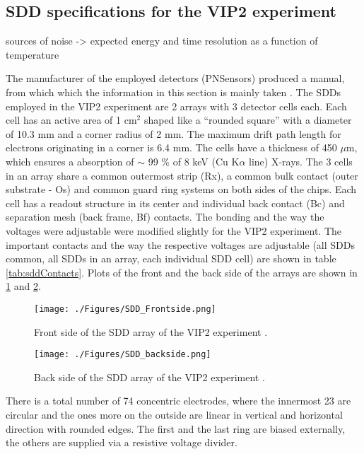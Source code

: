 \subsection{SDD specifications for the VIP2 experiment}

sources of noise -> expected energy and time resolution as a function of temperature 


The manufacturer of the employed detectors (PNSensors) produced a manual, from which which the information in this section is mainly taken \cite{Lechner}. The SDDs employed in the VIP2 experiment are 2 arrays with 3 detector cells each. Each cell has an active area of 1 cm$^{2}$ shaped like a ``rounded square'' with a diameter of 10.3 mm and a corner radius of 2 mm. The maximum drift path length for electrons originating in a corner is 6.4 mm. The cells have a thickness of 450 $\mu$m, which ensures a absorption of $\sim$ 99 \% of 8 keV (Cu K$\alpha$ line) X-rays. The 3 cells in an array share a common outermost strip (Rx), a common bulk contact (outer substrate - Os) and common guard ring systems on both sides of the chips. Each cell has a readout structure in its center and individual back contact (Bc) and separation mesh (back frame, Bf) contacts. The bonding and the way the voltages were adjustable were modified slightly for the VIP2 experiment. The important contacts and the way the respective voltages are adjustable (all SDDs common, all SDDs in an array, each individual SDD cell) are shown in table \ref{tab:sddContacts}. Plots of the front and the back side of the arrays are shown in \ref{fig:sdd_front} and \ref{fig:sdd_back}.
\begin{figure}[h]
 \centering
 \texttt{[image: ./Figures/SDD\_Frontside.png]}
 \caption{Front side of the SDD array of the VIP2 experiment \cite{Lechner}.}
 \label{fig:sdd_front}
\end{figure}
\begin{figure}[h]
 \centering
 \texttt{[image: ./Figures/SDD\_backside.png]}
 \caption{Back side of the SDD array of the VIP2 experiment \cite{Lechner}.}
 \label{fig:sdd_back}
\end{figure}
There is a total number of 74 concentric electrodes, where the innermost 23 are circular and the ones more on the outside are linear in vertical and horizontal direction with rounded edges. The first and the last ring are biased externally, the others are supplied via a resistive voltage divider.

